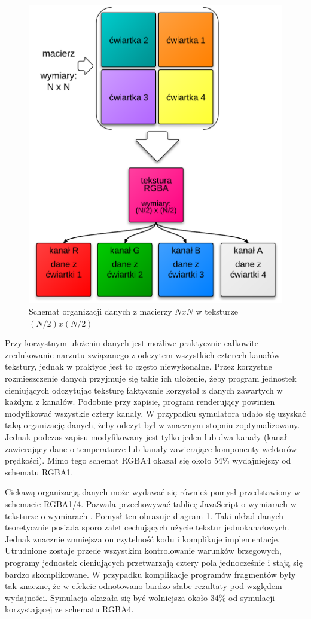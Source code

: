 \begin{figure}[!p]
\centering
\includegraphics[width=.65\textwidth]{img/rgba14Tex}
\caption{Schemat organizacji danych z macierzy $NxN$ w teksturze $(N/2)x(N/2)$}
\label{fig:rgba14Tex}
\end{figure}

Przy korzystnym ułożeniu danych jest możliwe praktycznie całkowite
zredukowanie narzutu związanego z odczytem wszystkich czterech kanałów
tekstury, jednak w praktyce jest to często niewykonalne. Przez korzystne
rozmieszczenie danych przyjmuje się takie ich ułożenie, żeby program jednostek
cieniujących odczytując teksturę faktycznie korzystał z danych zawartych w
każdym z kanałów. Podobnie przy zapisie, program renderujący powinien
modyfikować wszystkie cztery kanały. W przypadku symulatora 
udało się uzyskać taką organizację danych, żeby odczyt był w znacznym stopniu
zoptymalizowany. Jednak podczas zapisu modyfikowany jest tylko jeden lub dwa
kanały (kanał zawierający dane o temperaturze lub kanały zawierające
komponenty wektorów prędkości). Mimo tego schemat RGBA4 okazał się około 54\%
wydajniejszy od schematu RGBA1.

Ciekawą organizacją danych może wydawać się również pomysł przedstawiony w
schemacie RGBA1/4. Pozwala przechowywać tablicę JavaScript o wymiarach
 w teksturze o wymiarach . Pomysł ten obrazuje diagram
\ref{fig:rgba14Tex}. Taki układ danych teoretycznie posiada sporo zalet
cechujących użycie tekstur jednokanałowych. Jednak znacznie zmniejsza on
czytelność kodu i komplikuje implementacje. Utrudnione zostaje przede
wszystkim kontrolowanie warunków brzegowych, programy jednostek cieniujących
przetwarzają cztery pola jednocześnie i stają się bardzo skomplikowane. W
przypadku  komplikacje programów fragmentów były tak znaczne, że
w efekcie odnotowano bardzo słabe rezultaty pod względem wydajności. Symulacja
okazała się być wolniejsza około 34\% od symulacji korzystającej ze schematu
RGBA4.

